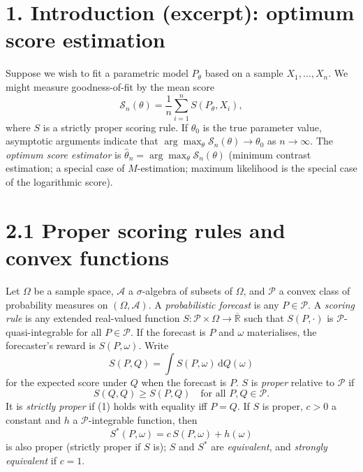 \documentclass{article}
\newcommand{\1}{\mathbb{1}}
\newcommand{\R}{\mathbb{R}}
\begin{document}
\section*{1. Introduction (excerpt): optimum score estimation}
Suppose we wish to fit a parametric model $P_\theta$ based on a sample
$X_1,\dots,X_n$. We might measure goodness-of-fit by the mean score
\[
  \mathcal{S}_n(\theta) = \frac{1}{n}\sum_{i=1}^n S(P_\theta, X_i),
\]
where $S$ is a strictly proper scoring rule. If $\theta_0$ is the true parameter
value, asymptotic arguments indicate that
$\arg\max_\theta \mathcal{S}_n(\theta) \to \theta_0$ as $n\to\infty$. The
\emph{optimum score estimator} is $\hat\theta_n = \arg\max_\theta \mathcal{S}_n(\theta)$
(minimum contrast estimation; a special case of $M$-estimation; maximum
likelihood is the special case of the logarithmic score).

\section*{2.1 Proper scoring rules and convex functions}
Let $\Omega$ be a sample space, $\mathcal{A}$ a $\sigma$-algebra of subsets of
$\Omega$, and $\mathcal{P}$ a convex class of probability measures on
$(\Omega,\mathcal{A})$. A \emph{probabilistic forecast} is any $P\in\mathcal{P}$.
A \emph{scoring rule} is any extended real-valued function
$S:\mathcal{P}\times\Omega\to\overline{\R}$ such that $S(P,\cdot)$ is
$\mathcal{P}$-quasi-integrable for all $P\in\mathcal{P}$. If the forecast is $P$
and $\omega$ materialises, the forecaster's reward is $S(P,\omega)$. Write
\[
  S(P,Q) = \int S(P,\omega)\,\mathrm{d}Q(\omega)
\]
for the expected score under $Q$ when the forecast is $P$. $S$ is \emph{proper}
relative to $\mathcal{P}$ if
\begin{equation}\tag{1}
  S(Q,Q) \ge S(P,Q) \quad \text{for all } P,Q\in\mathcal{P}.
\end{equation}
It is \emph{strictly proper} if (1) holds with equality iff $P=Q$. If $S$ is
proper, $c>0$ a constant and $h$ a $\mathcal{P}$-integrable function, then
\begin{equation}\tag{2}
  S^*(P,\omega) = c\,S(P,\omega) + h(\omega)
\end{equation}
is also proper (strictly proper if $S$ is); $S$ and $S^*$ are \emph{equivalent},
and \emph{strongly equivalent} if $c=1$.
\end{document}

